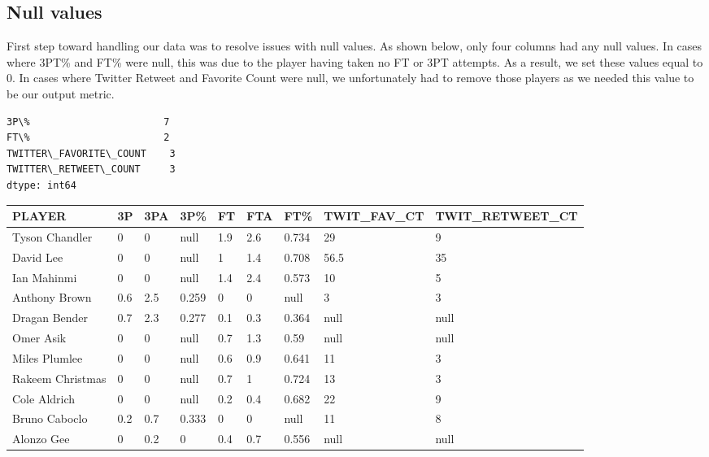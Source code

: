 \documentclass[11pt]{article}
\begin{document}
\subsection{Null values}\label{null-values}

First step toward handling our data was to resolve issues with null
values. As shown below, only four columns had any null values. In cases
where 3PT\% and FT\% were null, this was due to the player having taken
no FT or 3PT attempts. As a result, we set these values equal to 0. In
cases where Twitter Retweet and Favorite Count were null, we
unfortunately had to remove those players as we needed this value to be our output metric.


    \begin{Verbatim}[commandchars=\\\{\}]
3P\%                       7
FT\%                       2
TWITTER\_FAVORITE\_COUNT    3
TWITTER\_RETWEET\_COUNT     3
dtype: int64

    \end{Verbatim}

        
\begin{table}[h]
\begin{tabular}{@{}lllllllll@{}}
\toprule
PLAYER           & 3P  & 3PA & 3P\%  & FT  & FTA & FT\%  & TWIT\_FAV\_CT & TWIT\_RETWEET\_CT \\ \midrule
Tyson Chandler   & 0   & 0   & null   & 1.9 & 2.6 & 0.734 & 29                       & 9                       \\
David Lee        & 0   & 0   & null   & 1   & 1.4 & 0.708 & 56.5                     & 35                      \\
Ian Mahinmi      & 0   & 0   & null   & 1.4 & 2.4 & 0.573 & 10                       & 5                       \\
Anthony Brown    & 0.6 & 2.5 & 0.259 & 0   & 0   & null   & 3                        & 3                       \\
Dragan Bender    & 0.7 & 2.3 & 0.277 & 0.1 & 0.3 & 0.364 & null                      & null                     \\
Omer Asik        & 0   & 0   & null   & 0.7 & 1.3 & 0.59  & null                      & null                     \\
Miles Plumlee    & 0   & 0   & null   & 0.6 & 0.9 & 0.641 & 11                       & 3                       \\
Rakeem Christmas & 0   & 0   & null   & 0.7 & 1   & 0.724 & 13                       & 3                       \\
Cole Aldrich     & 0   & 0   & null   & 0.2 & 0.4 & 0.682 & 22                       & 9                       \\
Bruno Caboclo    & 0.2 & 0.7 & 0.333 & 0   & 0   & null   & 11                       & 8                       \\
Alonzo Gee       & 0   & 0.2 & 0     & 0.4 & 0.7 & 0.556 & null                      & null                     \\ \bottomrule
\end{tabular}
\end{table}
\end{document}
